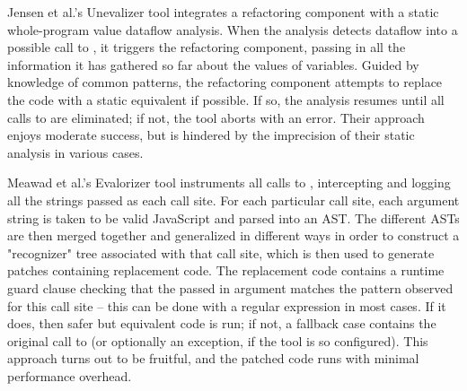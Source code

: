 Jensen et al.'s Unevalizer tool \cite{RemedyingTheEvalThatMenDo} integrates a
refactoring component with a static whole-program value dataflow analysis. When
the analysis detects dataflow into a possible call to , it triggers
the refactoring component, passing in all the information it has gathered so
far about the values of variables. Guided by knowledge of common patterns, the
refactoring component attempts to replace the code with a static equivalent if
possible. If so, the analysis resumes until all calls to  are
eliminated; if not, the tool aborts with an error. Their approach enjoys
moderate success, but is hindered by the imprecision of their static analysis
in various cases.

Meawad et al.'s \cite{EvalBegone} Evalorizer tool instruments all calls to
, intercepting and logging all the strings passed as each call site.
For each particular call site, each argument string is taken to be valid
JavaScript and parsed into an AST. The different ASTs are then merged together
and generalized in different ways in order to construct a "recognizer" tree
associated with that call site, which is then used to generate patches
containing replacement code. The replacement code contains a runtime guard
clause checking that the passed in argument matches the pattern observed for
this call site -- this can be done with a regular expression in most cases. If
it does, then safer but equivalent code is run; if not, a fallback case
contains the original call to  (or optionally an exception, if the
tool is so configured). This approach turns out to be fruitful, and the patched
code runs with minimal performance overhead.
